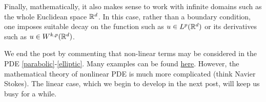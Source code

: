 \documentclass[
    a4paper,
    DIV=14,
    abstract=true,
    numbers=noenddot
]{scrartcl}
\begin{document}
Finally, mathematically, it also makes sense to work with infinite domains such as the whole Euclidean space $\mathbb{R}^d$. In this case, rather than a boundary condition, one imposes suitable decay on the function such as $u \in L^p(\mathbb{R}^d)$ or its derivatives such as $u \in W^{k,p}(\mathbb{R}^d)$.


We end the post by commenting that non-linear terms may be considered in the PDE \eqref{parabolic}-\eqref{elliptic}. Many examples can be found \href{https://en.wikipedia.org/wiki/List_of_nonlinear_partial_differential_equations}{here}. However, the mathematical theory of nonlinear PDE is much more complicated (think Navier Stokes). The linear case, which we begin to develop in the next post, will keep us busy for a while.
\end{document}
